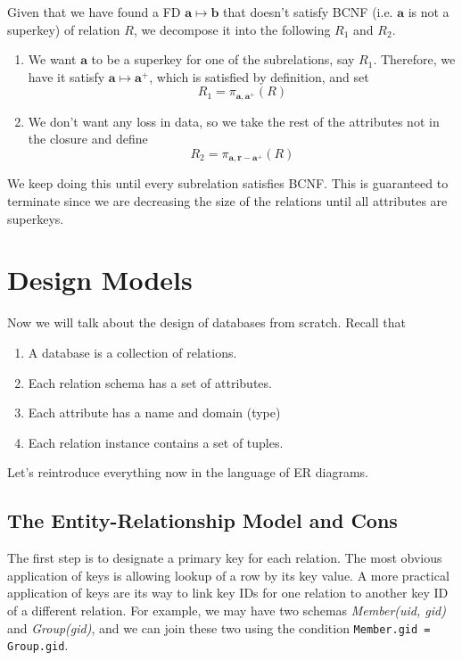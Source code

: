 \documentclass{article}
\begin{document}
    Given that we have found a FD $\mathbf{a} \mapsto \mathbf{b}$ that doesn't satisfy BCNF (i.e. $\mathbf{a}$ is not a superkey) of relation $R$, we decompose it into the following $R_1$ and $R_2$. 
    \begin{enumerate}
      \item We want $\mathbf{a}$ to be a superkey for one of the subrelations, say $R_1$. Therefore, we have it satisfy $\mathbf{a} \mapsto \mathbf{a}^+$, which is satisfied by definition, and set 
        \begin{equation}
          R_1 = \pi_{\mathbf{a}, \mathbf{a}^+} (R)
        \end{equation}
      \item We don't want any loss in data, so we take the rest of the attributes not in the closure and define  
        \begin{equation}
          R_2 = \pi_{\mathbf{a}, \mathbf{r} - \mathbf{a}^+} (R)
        \end{equation}
    \end{enumerate}
    We keep doing this until every subrelation satisfies BCNF. This is guaranteed to terminate since we are decreasing the size of the relations until all attributes are superkeys.  

\section{Design Models}

    Now we will talk about the design of databases from scratch. Recall that 
    \begin{enumerate}
      \item A database is a collection of relations. 
      \item Each relation schema has a set of attributes. 
      \item Each attribute has a name and domain (type) 
      \item Each relation instance contains a set of tuples. 
    \end{enumerate}

    Let's reintroduce everything now in the language of ER diagrams. 

  \subsection{The Entity-Relationship Model and Cons} 

    The first step is to designate a primary key for each relation. The most obvious application of keys is allowing lookup of a row by its key value. A more practical application of keys are its way to link key IDs for one relation to another key ID of a different relation. For example, we may have two schemas \textit{Member(uid, gid)} and \textit{Group(gid)}, and we can join these two using the condition \texttt{Member.gid = Group.gid}. 
\end{document}
